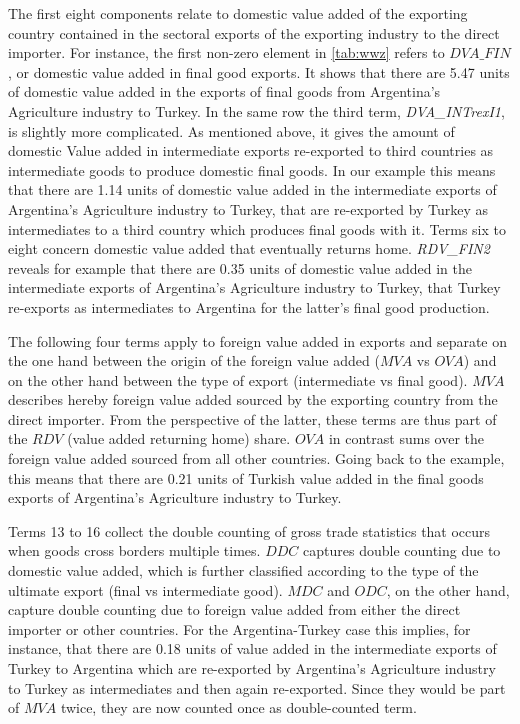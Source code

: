 \documentclass[a4paper]{article}\usepackage[]{graphicx}\usepackage[]{color}
\begin{document}
The first eight components relate to domestic value added of the exporting country contained in the sectoral exports of the exporting industry to the direct importer. 
For instance, the first non-zero element in \cref{tab:wwz} refers to $DVA\_FIN$, or domestic value added in final good exports. 
It shows that there are 5.47 units of domestic value added in the exports of final goods from Argentina's Agriculture industry to Turkey. 
In the same row the third term,  \textit{DVA\_INTrexI1}, is slightly more complicated. 
As mentioned above, it gives the amount of domestic Value added in intermediate exports re-exported to third countries as intermediate goods to produce domestic final goods. 
In our example this means that there are 1.14 units of domestic value added in the intermediate exports of Argentina's Agriculture industry to Turkey, 
that are re-exported by Turkey as intermediates to a third country which produces final goods with it. 
Terms six to eight concern domestic value added that eventually returns home. 
\textit{RDV\_FIN2} reveals for example that there are 0.35 units of domestic value added in the intermediate exports of Argentina's Agriculture industry to Turkey, 
that Turkey re-exports as intermediates to Argentina for the latter's final good production.

The following four terms apply to foreign value added in exports and separate on the one hand between the origin of the foreign value added ($MVA$ vs $OVA$) and on the other hand between the type of export (intermediate vs final good). 
$MVA$ describes hereby foreign value added sourced by the exporting country from the direct importer. 
From the perspective of the latter, these terms are thus part of the $RDV$ (value added returning home) share. 
$OVA$ in contrast sums over the foreign value added sourced from all other countries. 
Going back to the example, this means that there are 0.21 units of Turkish value added in the final goods exports of Argentina's Agriculture industry to Turkey.

Terms 13 to 16 collect the double counting of gross trade statistics that occurs when goods cross borders multiple times. 
$DDC$ captures double counting due to domestic value added, 
which is further classified according to the type of the ultimate export (final vs intermediate good). 
$MDC$ and $ODC$, on the other hand, capture double counting due to foreign value added from either the direct importer or other countries. 
For the Argentina-Turkey case this implies, for instance, that there are 0.18 units of value added in the intermediate exports of Turkey to Argentina which are re-exported by Argentina's Agriculture industry to Turkey as intermediates and then again re-exported. 
Since they would be part of $MVA$ twice, they are now counted once as double-counted term.
\end{document}
